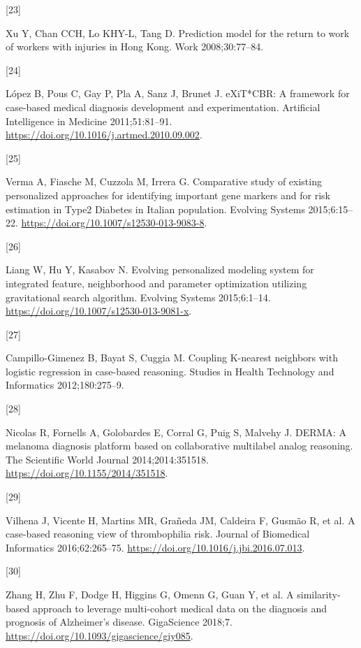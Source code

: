\documentclass[preprint, 3p,
authoryear]{elsarticle} %
\newlength{\cslhangindent}
\newlength{\csllabelwidth}
\newlength{\cslentryspacingunit} %
\newenvironment{CSLReferences}[2] %
 {%
  \setlength{\parindent}{0pt}
  \ifodd #1
  \let\oldpar\par
  \def\par{\hangindent=\cslhangindent\oldpar}
  \fi
  \setlength{\parskip}{#2\cslentryspacingunit}
 }%
 {}
\newcommand{\CSLLeftMargin}[1]{\parbox[t]{\csllabelwidth}{#1}}
\newcommand{\CSLRightInline}[1]{\parbox[t]{\linewidth - \csllabelwidth}{#1}\break}
\begin{document}
\begin{CSLReferences}{0}{0}
\leavevmode{}%
\CSLLeftMargin{{[}23{]} }%
\CSLRightInline{Xu Y, Chan CCH, Lo KHY-L, Tang D. Prediction model for
the return to work of workers with injuries in {Hong Kong}. Work
2008;30:77--84.}

\leavevmode{}%
\CSLLeftMargin{{[}24{]} }%
\CSLRightInline{López B, Pous C, Gay P, Pla A, Sanz J, Brunet J.
{eXiT}*{CBR}: {A} framework for case-based medical diagnosis development
and experimentation. Artificial Intelligence in Medicine 2011;51:81--91.
\url{https://doi.org/10.1016/j.artmed.2010.09.002}.}

\leavevmode{}%
\CSLLeftMargin{{[}25{]} }%
\CSLRightInline{Verma A, Fiasche M, Cuzzola M, Irrera G. Comparative
study of existing personalized approaches for identifying important gene
markers and for risk estimation in {Type2 Diabetes} in {Italian}
population. Evolving Systems 2015;6:15--22.
\url{https://doi.org/10.1007/s12530-013-9083-8}.}

\leavevmode{}%
\CSLLeftMargin{{[}26{]} }%
\CSLRightInline{Liang W, Hu Y, Kasabov N. Evolving personalized modeling
system for integrated feature, neighborhood and parameter optimization
utilizing gravitational search algorithm. Evolving Systems 2015;6:1--14.
\url{https://doi.org/10.1007/s12530-013-9081-x}.}

\leavevmode{}%
\CSLLeftMargin{{[}27{]} }%
\CSLRightInline{Campillo-Gimenez B, Bayat S, Cuggia M. Coupling
{K-nearest} neighbors with logistic regression in case-based reasoning.
Studies in Health Technology and Informatics 2012;180:275--9.}

\leavevmode{}%
\CSLLeftMargin{{[}28{]} }%
\CSLRightInline{Nicolas R, Fornells A, Golobardes E, Corral G, Puig S,
Malvehy J. {DERMA}: A melanoma diagnosis platform based on collaborative
multilabel analog reasoning. The Scientific World Journal
2014;2014:351518. \url{https://doi.org/10.1155/2014/351518}.}

\leavevmode{}%
\CSLLeftMargin{{[}29{]} }%
\CSLRightInline{Vilhena J, Vicente H, Martins MR, Grañeda JM, Caldeira
F, Gusmão R, et al. A case-based reasoning view of thrombophilia risk.
Journal of Biomedical Informatics 2016;62:265--75.
\url{https://doi.org/10.1016/j.jbi.2016.07.013}.}

\leavevmode{}%
\CSLLeftMargin{{[}30{]} }%
\CSLRightInline{Zhang H, Zhu F, Dodge H, Higgins G, Omenn G, Guan Y, et
al. A similarity-based approach to leverage multi-cohort medical data on
the diagnosis and prognosis of {Alzheimer}'s disease. GigaScience
2018;7. \url{https://doi.org/10.1093/gigascience/giy085}.}


\end{CSLReferences}
\end{document}
